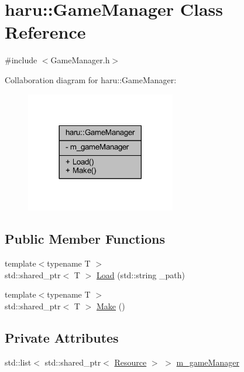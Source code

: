 \hypertarget{classharu_1_1_game_manager}{}\section{haru\+:\+:Game\+Manager Class Reference}
\label{classharu_1_1_game_manager}


{\ttfamily \#include $<$Game\+Manager.\+h$>$}



Collaboration diagram for haru\+:\+:Game\+Manager\+:\nopagebreak
\begin{figure}[H]
\begin{center}
\leavevmode
\includegraphics[width=185pt]{classharu_1_1_game_manager__coll__graph}
\end{center}
\end{figure}
\subsection*{Public Member Functions}
\begin{DoxyCompactItemize}
\item 
{\footnotesize template$<$typename T $>$ }\\std\+::shared\+\_\+ptr$<$ T $>$ \mbox{\hyperlink{classharu_1_1_game_manager_aa20022da42f771c1ff173f32570ed9b6}{Load}} (std\+::string \+\_\+path)
\item 
{\footnotesize template$<$typename T $>$ }\\std\+::shared\+\_\+ptr$<$ T $>$ \mbox{\hyperlink{classharu_1_1_game_manager_a447a6d9d5018fd8dcc0ab87f2ed4326d}{Make}} ()
\end{DoxyCompactItemize}
\subsection*{Private Attributes}
\begin{DoxyCompactItemize}
\item 
std\+::list$<$ std\+::shared\+\_\+ptr$<$ \mbox{\hyperlink{classharu_1_1_resource}{Resource}} $>$ $>$ \mbox{\hyperlink{classharu_1_1_game_manager_ab0183c1fa19eafb1448cc4e0a42e17c0}{m\+\_\+game\+Manager}}
\end{DoxyCompactItemize}


